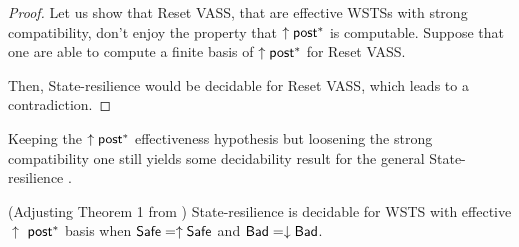 \begin{proof}
Let us show that Reset VASS, that are effective WSTSs with strong compatibility, don't enjoy the property that $\uparrow \textsf{post}^*$ is computable.
Suppose that one are able to compute a finite basis of $\uparrow \textsf{post}^*$ for Reset VASS. 
\iffalse
Then, one would be able to decide whether an element $m \in \min(\uparrow \post^*)$ is reachable.
by examining if there is %
$0$ in the basis%
. But reachability of $0$  %
is undecidable for Reset VASS. 
\fi
Then, {\sc State-resilience} would be decidable for Reset VASS, which leads to a contradiction.
\end{proof}



%
%
%











Keeping the $\uparrow \textsf{post}^*$ effectiveness hypothesis but loosening the strong compatibility one still yields some decidability result for the general {\sc State-resilience }.


\begin{theorem}{(Adjusting Theorem 1 from \cite{DBLP:journals/corr/abs-2108-00889})}\label{post srp}
{\sc State-resilience} is decidable for 
 WSTS with effective 
$\uparrow$ $\textsf{post}^*$ basis
when
$\textsf{Safe}=\uparrow \textsf{Safe}$
and $\textsf{Bad}=\downarrow \textsf{Bad}$.
\end{theorem}


